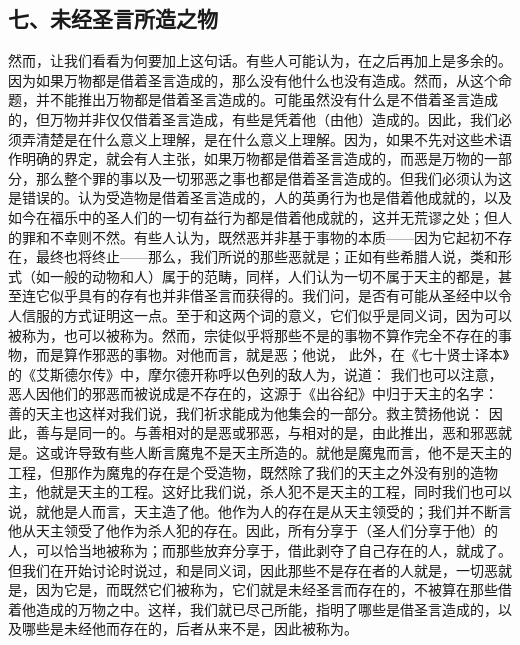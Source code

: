 
\subsection{七、未经圣言所造之物}

然而，让我们看看为何要加上这句话。有些人可能认为，在之后再加上是多余的。因为如果万物都是借着圣言造成的，那么没有他什么也没有造成。然而，从这个命题，并不能推出万物都是借着圣言造成的。可能虽然没有什么是不借着圣言造成的，但万物并非仅仅借着圣言造成，有些是凭着他（由他）造成的。因此，我们必须弄清楚是在什么意义上理解，是在什么意义上理解。因为，如果不先对这些术语作明确的界定，就会有人主张，如果万物都是借着圣言造成的，而恶是万物的一部分，那么整个罪的事以及一切邪恶之事也都是借着圣言造成的。但我们必须认为这是错误的。认为受造物是借着圣言造成的，人的英勇行为也是借着他成就的，以及如今在福乐中的圣人们的一切有益行为都是借着他成就的，这并无荒谬之处；但人的罪和不幸则不然。有些人认为，既然恶并非基于事物的本质——因为它起初不存在，最终也将终止——那么，我们所说的那些恶就是；正如有些希腊人说，类和形式（如一般的动物和人）属于的范畴，同样，人们认为一切不属于天主的都是，甚至连它似乎具有的存有也并非借圣言而获得的。我们问，是否有可能从圣经中以令人信服的方式证明这一点。至于和这两个词的意义，它们似乎是同义词，因为可以被称为，也可以被称为。然而，宗徒似乎将那些不是的事物不算作完全不存在的事物，而是算作邪恶的事物。对他而言，就是恶；他说， 此外，在《七十贤士译本》的《艾斯德尔传》中，摩尔德开称呼以色列的敌人为，说道： 我们也可以注意，恶人因他们的邪恶而被说成是不存在的，这源于《出谷纪》中归于天主的名字： 善的天主也这样对我们说，我们祈求能成为他集会的一部分。救主赞扬他说： 因此，善与是同一的。与善相对的是恶或邪恶，与相对的是，由此推出，恶和邪恶就是。这或许导致有些人断言魔鬼不是天主所造的。就他是魔鬼而言，他不是天主的工程，但那作为魔鬼的存在是个受造物，既然除了我们的天主之外没有别的造物主，他就是天主的工程。这好比我们说，杀人犯不是天主的工程，同时我们也可以说，就他是人而言，天主造了他。他作为人的存在是从天主领受的；我们并不断言他从天主领受了他作为杀人犯的存在。因此，所有分享于（圣人们分享于他）的人，可以恰当地被称为；而那些放弃分享于，借此剥夺了自己存在的人，就成了。但我们在开始讨论时说过，和是同义词，因此那些不是存在者的人就是，一切恶就是，因为它是，而既然它们被称为，它们就是未经圣言而存在的，不被算在那些借着他造成的万物之中。这样，我们就已尽己所能，指明了哪些是借圣言造成的，以及哪些是未经他而存在的，后者从来不是，因此被称为。\par

